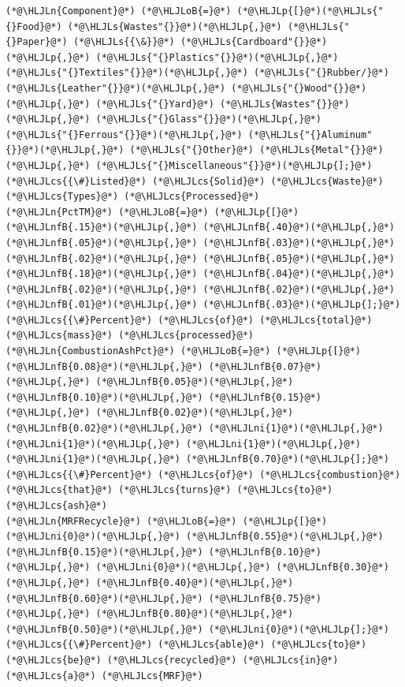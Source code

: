 \documentclass[12pt,a4paper]{article}
\newcommand{\HLJLn}[1]{#1}
\newcommand{\HLJLs}[1]{\textcolor[RGB]{201,61,57}{#1}}
\newcommand{\HLJLnfB}[1]{\textcolor[RGB]{59,151,46}{#1}}
\newcommand{\HLJLni}[1]{\textcolor[RGB]{59,151,46}{#1}}
\newcommand{\HLJLoB}[1]{\textcolor[RGB]{102,102,102}{\textbf{#1}}}
\newcommand{\HLJLp}[1]{#1}
\newcommand{\HLJLcs}[1]{\textcolor[RGB]{153,153,119}{\textit{#1}}}
\begin{document}
\begin{lstlisting}
(*@\HLJLn{Component}@*) (*@\HLJLoB{=}@*) (*@\HLJLp{[}@*)(*@\HLJLs{"{}Food}@*) (*@\HLJLs{Wastes"{}}@*)(*@\HLJLp{,}@*) (*@\HLJLs{"{}Paper}@*) (*@\HLJLs{{\&}}@*) (*@\HLJLs{Cardboard"{}}@*)(*@\HLJLp{,}@*) (*@\HLJLs{"{}Plastics"{}}@*)(*@\HLJLp{,}@*) (*@\HLJLs{"{}Textiles"{}}@*)(*@\HLJLp{,}@*) (*@\HLJLs{"{}Rubber/}@*) (*@\HLJLs{Leather"{}}@*)(*@\HLJLp{,}@*) (*@\HLJLs{"{}Wood"{}}@*)(*@\HLJLp{,}@*) (*@\HLJLs{"{}Yard}@*) (*@\HLJLs{Wastes"{}}@*)(*@\HLJLp{,}@*) (*@\HLJLs{"{}Glass"{}}@*)(*@\HLJLp{,}@*) 
(*@\HLJLs{"{}Ferrous"{}}@*)(*@\HLJLp{,}@*) (*@\HLJLs{"{}Aluminum"{}}@*)(*@\HLJLp{,}@*) (*@\HLJLs{"{}Other}@*) (*@\HLJLs{Metal"{}}@*)(*@\HLJLp{,}@*) (*@\HLJLs{"{}Miscellaneous"{}}@*)(*@\HLJLp{];}@*) (*@\HLJLcs{{\#}Listed}@*) (*@\HLJLcs{Solid}@*) (*@\HLJLcs{Waste}@*) (*@\HLJLcs{Types}@*) (*@\HLJLcs{Processed}@*)
(*@\HLJLn{PctTM}@*) (*@\HLJLoB{=}@*) (*@\HLJLp{[}@*)(*@\HLJLnfB{.15}@*)(*@\HLJLp{,}@*) (*@\HLJLnfB{.40}@*)(*@\HLJLp{,}@*) (*@\HLJLnfB{.05}@*)(*@\HLJLp{,}@*) (*@\HLJLnfB{.03}@*)(*@\HLJLp{,}@*) (*@\HLJLnfB{.02}@*)(*@\HLJLp{,}@*) (*@\HLJLnfB{.05}@*)(*@\HLJLp{,}@*) (*@\HLJLnfB{.18}@*)(*@\HLJLp{,}@*) (*@\HLJLnfB{.04}@*)(*@\HLJLp{,}@*) (*@\HLJLnfB{.02}@*)(*@\HLJLp{,}@*) (*@\HLJLnfB{.02}@*)(*@\HLJLp{,}@*) (*@\HLJLnfB{.01}@*)(*@\HLJLp{,}@*) (*@\HLJLnfB{.03}@*)(*@\HLJLp{];}@*) (*@\HLJLcs{{\#}Percent}@*) (*@\HLJLcs{of}@*) (*@\HLJLcs{total}@*) (*@\HLJLcs{mass}@*) (*@\HLJLcs{processed}@*)
(*@\HLJLn{CombustionAshPct}@*) (*@\HLJLoB{=}@*) (*@\HLJLp{[}@*)(*@\HLJLnfB{0.08}@*)(*@\HLJLp{,}@*) (*@\HLJLnfB{0.07}@*)(*@\HLJLp{,}@*) (*@\HLJLnfB{0.05}@*)(*@\HLJLp{,}@*) (*@\HLJLnfB{0.10}@*)(*@\HLJLp{,}@*) (*@\HLJLnfB{0.15}@*)(*@\HLJLp{,}@*) (*@\HLJLnfB{0.02}@*)(*@\HLJLp{,}@*) (*@\HLJLnfB{0.02}@*)(*@\HLJLp{,}@*) (*@\HLJLni{1}@*)(*@\HLJLp{,}@*) (*@\HLJLni{1}@*)(*@\HLJLp{,}@*) (*@\HLJLni{1}@*)(*@\HLJLp{,}@*) (*@\HLJLni{1}@*)(*@\HLJLp{,}@*) (*@\HLJLnfB{0.70}@*)(*@\HLJLp{];}@*) (*@\HLJLcs{{\#}Percent}@*) (*@\HLJLcs{of}@*) (*@\HLJLcs{combustion}@*) (*@\HLJLcs{that}@*) (*@\HLJLcs{turns}@*) (*@\HLJLcs{to}@*) (*@\HLJLcs{ash}@*)
(*@\HLJLn{MRFRecycle}@*) (*@\HLJLoB{=}@*) (*@\HLJLp{[}@*)(*@\HLJLni{0}@*)(*@\HLJLp{,}@*) (*@\HLJLnfB{0.55}@*)(*@\HLJLp{,}@*) (*@\HLJLnfB{0.15}@*)(*@\HLJLp{,}@*) (*@\HLJLnfB{0.10}@*)(*@\HLJLp{,}@*) (*@\HLJLni{0}@*)(*@\HLJLp{,}@*) (*@\HLJLnfB{0.30}@*)(*@\HLJLp{,}@*) (*@\HLJLnfB{0.40}@*)(*@\HLJLp{,}@*) (*@\HLJLnfB{0.60}@*)(*@\HLJLp{,}@*) (*@\HLJLnfB{0.75}@*)(*@\HLJLp{,}@*) (*@\HLJLnfB{0.80}@*)(*@\HLJLp{,}@*) (*@\HLJLnfB{0.50}@*)(*@\HLJLp{,}@*) (*@\HLJLni{0}@*)(*@\HLJLp{];}@*) (*@\HLJLcs{{\#}Percent}@*) (*@\HLJLcs{able}@*) (*@\HLJLcs{to}@*) (*@\HLJLcs{be}@*) (*@\HLJLcs{recycled}@*) (*@\HLJLcs{in}@*) (*@\HLJLcs{a}@*) (*@\HLJLcs{MRF}@*)



\end{lstlisting}
\end{document}

